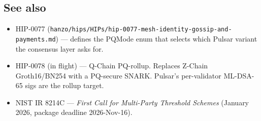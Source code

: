 \subsection{See also}

\begin{itemize}[leftmargin=*, itemsep=0pt]
\item HIP-0077
(\texttt{hanzo/hips/HIPs/hip-0077-mesh-identity-gossip-and-payments.md})
--- defines the PQMode enum that selects which Pulsar variant the
consensus layer asks for.
\item HIP-0078 (in flight) --- Q-Chain PQ-rollup. Replaces Z-Chain
Groth16/BN254 with a PQ-secure SNARK. Pulsar's per-validator
ML-DSA-65 sigs are the rollup target.
\item NIST IR 8214C --- \emph{First Call for Multi-Party Threshold
Schemes} (January 2026, package deadline 2026-Nov-16).
\end{itemize}
